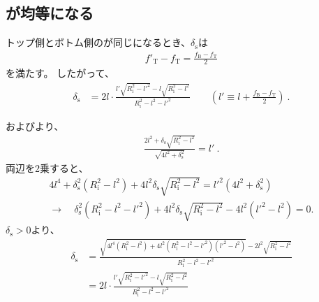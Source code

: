 \subsection{\AlocationLength が均等になる\SpacerThickness}
トップ側とボトム側の\AlocationLength が同じになるとき、$\delta_\mathrm s$は
\begin{align}
  \label{eq:condtionequalalocation}
  f'_\mathrm T - f_\mathrm T = \frac{f_\mathrm B - f_\mathrm T}2
\end{align}
を満たす。
したがって、
\begin{align*}
  \delta_\mathrm s
  &= 2l\cdot\frac{l'\sqrt{R_\mathrm i^2-l'^2}-l\sqrt{R_\mathrm i^2-l^2}}{R_\mathrm i^2-l^2-l'^2}
     \qquad\left(l' \equiv l + \frac{f_\mathrm B-f_\mathrm T}2\right)\ .
\end{align*}
\begin{hosoku}
およびより、
\begin{align*}
  \frac{2l^2+\delta_\mathrm s\sqrt{R_\mathrm i^2-l^2}}{\sqrt{4l^2+\delta_\mathrm s^2}} = l'\ .
\end{align*}
両辺を2乗すると、
\begin{gather*}
  4l^4+\delta_\mathrm s^2\left(R_\mathrm i^2-l^2\right)+4l^2\delta_\mathrm s\sqrt{R_\mathrm i^2-l^2}
  = l'^2\left(4l^2+\delta_\mathrm s^2\right)\\
  \longrightarrow\quad
  \delta_\mathrm s^2\left(R_\mathrm i^2-l^2-l'^2\right)
  +4l^2\delta_\mathrm s\sqrt{R_\mathrm i^2-l^2} -4l^2\left(l'^2 - l^2\right)
  = 0.
\end{gather*}
$\delta_\mathrm s > 0$より、
\begin{align*}
  \delta_\mathrm s
  &= \frac{\sqrt{4l^4\left(R_\mathrm i^2-l^2\right)
                 +4l^2\left(R_\mathrm i^2-l^2-l'^2\right)\left(l'^2 - l^2\right)}
           -2l^2\sqrt{R_\mathrm i^2-l^2}}{R_\mathrm i^2-l^2-l'^2}\\
  &= 2l\cdot\frac{l'\sqrt{R_\mathrm i^2-l'^2}-l\sqrt{R_\mathrm i^2-l^2}}{R_\mathrm i^2-l^2-l'^2}
\end{align*}
\end{hosoku}



